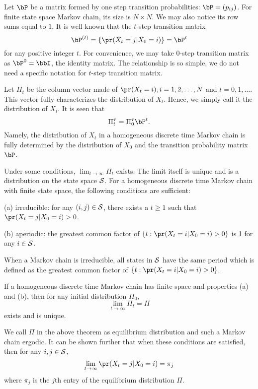 Let $\bP$ be a matrix formed by one step transition probabilities:
$\bP = (p_{ij})$. For finite state space Markov chain, its size is
$N \times N$. We may also notice its row sums 
equal to $1$. It is well known that the $t$-step transition matrix 
\[
\bP^{(t)} = \{ \pr(X_t = j| X_0 = i)\} = \bP^t
\]
for any positive integer $t$. For convenience, we may
take 0-step transition matrix as $\bP^{0} = \bbI$, the identity matrix.
The relationship is so simple, we do not need a specific
notation for $t$-step transition matrix.

Let $\Pi_t$ be the column vector made of $\pr(X_t = i), i=1, 2, \ldots, N$
and $t=0, 1, \ldots$. This vector fully characterizes the distribution of $X_t$. 
Hence, we simply call it the distribution of $X_t$.
It is seen that
\[
\Pi_t^\tau  = \Pi_0^\tau  \bP^t.
\]
Namely, the distribution of $X_t$ in a homogeneous
discrete time Markov chain is fully determined by the
distribution of $X_0$ and the transition probability matrix
$\bP$.

Under some conditions, $\lim_{t \to \infty} \Pi_t$ exists. The limit itself is unique
and is a distribution on the state space ${\cal S}$. 
For a homogeneous discrete time Markov chain with 
finite state space, the following conditions are sufficient:


(a) irreducible:
        for any $(i, j) \in {\cal S}$, there exists a $t \geq 1$ such that
       $\pr(X_t = j| X_0 = i) > 0$. 
       
(b) aperiodic:
       the greatest common factor of $\{t: \pr(X_t = i| X_0 = i) > 0\}$
       is 1 for any $i \in  {\cal S}$.
       
When a Markov chain is irreducible, all states in ${\cal S}$ have
the same period which is defined as the 
greatest common factor of $\{t: \pr(X_t = i| X_0 = i) > 0\}$.

       
\begin{theorem}
If a homogeneous discrete time Markov chain has finite space
and properties (a) and (b), then for any initial distribution $\Pi_0$,
\[
\lim_{t \to \infty} \Pi_t = \Pi
\]
exists and is unique.
\end{theorem}

We call $\Pi$ in the above theorem as equilibrium distribution
and such a Markov chain ergodic. It can be shown further that
when these conditions are satisfied, then for any $i, j \in {\cal S}$,
\[
\lim_{t \to \infty} \pr(X_t = j | X_0 = i) = \pi_j
\]
where $\pi_j$ is the $j$th entry of the equilibrium distribution $\Pi$.
       

